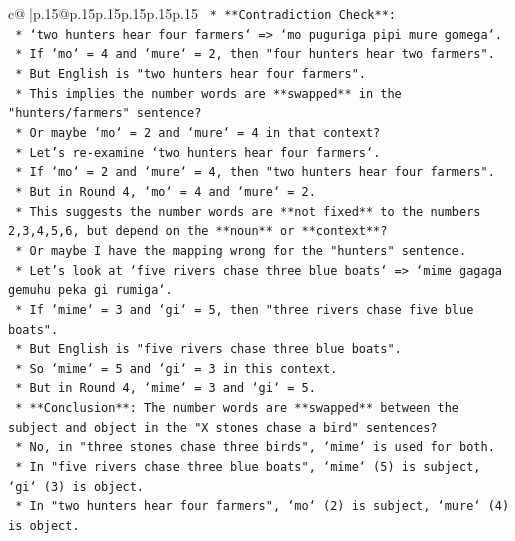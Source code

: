 \documentclass{article}
\begin{document}
{\begin{supertabular}{c@{$\;$}|p{.15\linewidth}@{}p{.15\linewidth}p{.15\linewidth}p{.15\linewidth}p{.15\linewidth}p{.15\linewidth}}
{{{\texttt{    *   **Contradiction Check**:} \\
\texttt{        *   `two hunters hear four farmers` => `mo puguriga pipi mure gomega`.} \\
\texttt{        *   If `mo` = 4 and `mure` = 2, then "four hunters hear two farmers".} \\
\texttt{        *   But English is "two hunters hear four farmers".} \\
\texttt{        *   This implies the number words are **swapped** in the "hunters/farmers" sentence?} \\
\texttt{        *   Or maybe `mo` = 2 and `mure` = 4 in that context?} \\
\texttt{        *   Let's re{-}examine `two hunters hear four farmers`.} \\
\texttt{        *   If `mo` = 2 and `mure` = 4, then "two hunters hear four farmers".} \\
\texttt{        *   But in Round 4, `mo` = 4 and `mure` = 2.} \\
\texttt{        *   This suggests the number words are **not fixed** to the numbers 2,3,4,5,6, but depend on the **noun** or **context**?} \\
\texttt{        *   Or maybe I have the mapping wrong for the "hunters" sentence.} \\
\texttt{        *   Let's look at `five rivers chase three blue boats` => `mime gagaga gemuhu peka gi rumiga`.} \\
\texttt{        *   If `mime` = 3 and `gi` = 5, then "three rivers chase five blue boats".} \\
\texttt{        *   But English is "five rivers chase three blue boats".} \\
\texttt{        *   So `mime` = 5 and `gi` = 3 in this context.} \\
\texttt{        *   But in Round 4, `mime` = 3 and `gi` = 5.} \\
\texttt{        *   **Conclusion**: The number words are **swapped** between the subject and object in the "X stones chase a bird" sentences?} \\
\texttt{        *   No, in "three stones chase three birds", `mime` is used for both.} \\
\texttt{        *   In "five rivers chase three blue boats", `mime` (5) is subject, `gi` (3) is object.} \\
\texttt{        *   In "two hunters hear four farmers", `mo` (2) is subject, `mure` (4) is object.} \\
}}}
\end{supertabular}}
\end{document}
